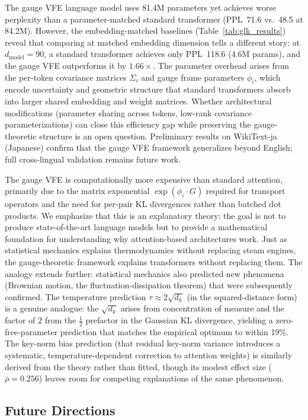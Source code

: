 \documentclass[twoside,11pt]{article}
\begin{document}
The gauge VFE language model uses 81.4M parameters yet achieves worse perplexity than a parameter-matched standard transformer (PPL~71.6 vs.\ 48.5 at 84.2M). However, the embedding-matched baselines (Table~\ref{tab:glk_results}) reveal that comparing at matched embedding dimension tells a different story: at $d_{\text{model}} = 90$, a standard transformer achieves only PPL~118.6 (4.6M params), and the gauge VFE outperforms it by $1.66\times$. The parameter overhead arises from the per-token covariance matrices $\Sigma_i$ and gauge frame parameters $\phi_i$, which encode uncertainty and geometric structure that standard transformers absorb into larger shared embedding and weight matrices. Whether architectural modifications (parameter sharing across tokens, low-rank covariance parameterizations) can close this efficiency gap while preserving the gauge-theoretic structure is an open question. Preliminary results on WikiText-ja (Japanese) confirm that the gauge VFE framework generalizes beyond English; full cross-lingual validation remains future work.

The gauge VFE is computationally more expensive than standard attention, primarily due to the matrix exponential $\exp(\phi_i \cdot G)$ required for transport operators and the need for per-pair KL divergences rather than batched dot products. We emphasize that this is an explanatory theory: the goal is not to produce state-of-the-art language models but to provide a mathematical foundation for understanding why attention-based architectures work. Just as statistical mechanics explains thermodynamics without replacing steam engines, the gauge-theoretic framework explains transformers without replacing them. The analogy extends further: statistical mechanics also predicted new phenomena (Brownian motion, the fluctuation-dissipation theorem) that were subsequently confirmed. The temperature prediction $\tau \approx 2\sqrt{d_k}$ (in the squared-distance form) is a genuine analogue: the $\sqrt{d_k}$ arises from concentration of measure and the factor of $2$ from the $\frac{1}{2}$ prefactor in the Gaussian KL divergence, yielding a zero-free-parameter prediction that matches the empirical optimum to within 19\%. The key-norm bias prediction (that residual key-norm variance introduces a systematic, temperature-dependent correction to attention weights) is similarly derived from the theory rather than fitted, though its modest effect size ($\bar{\rho} = 0.256$) leaves room for competing explanations of the same phenomenon.

\subsection{Future Directions}
\end{document}
